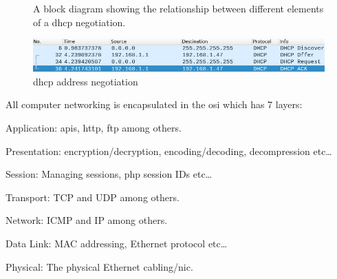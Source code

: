 \documentclass[titlepage]{article}
\begin{document}
\begin{figure}[H]

  \begin{framed}

  \centering

  \end{framed}

  \caption{%
    A block diagram showing the relationship between
    different elements of a \gls{dhcp} negotiation.
  }\label{dhcpdiagram}
\end{figure}

\begin{figure}[H]
  \centering
  \includegraphics[width=\textwidth]{screenshots/dhcp_negotiation.png}
  \caption{\gls{dhcp} address negotiation}\label{dhcp_negotiate}
\end{figure}

All computer networking is encapsulated in the \gls{osi} which has 7 layers:

\begin{etaremune}
  \item{Application: \gls{api}s, \gls{http}, \gls{ftp} among others.}
  \item{Presentation: encryption/decryption, encoding/decoding, decompression etc\ldots}
  \item{Session: Managing sessions, \gls{php} session IDs etc\ldots}
  \item{Transport: TCP and UDP among others.}
  \item{Network: ICMP and IP among others.}
  \item{Data Link: MAC addressing, Ethernet protocol etc\ldots}
  \item{Physical: The physical Ethernet cabling/\gls{nic}.}
\end{etaremune}
\end{document}
